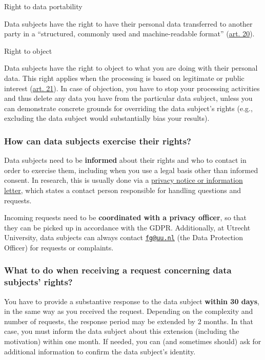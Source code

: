 \documentclass[
]{book}
\begin{document}
Right to data portability

Data subjects have the right to have their personal data transferred to
another party in a ``structured, commonly used and machine-readable format''
(\href{https://gdpr-info.eu/art-20-gdpr/}{art. 20}).

Right to object

Data subjects have the right to object to what you are doing with their
personal data. This right applies when the processing is based on legitimate
or public interest (\href{https://gdpr-info.eu/art-21-gdpr/}{art. 21}).
In case of objection, you have to stop your processing activities and thus
delete any data you have from the particular data subject, unless you can
demonstrate concrete grounds for overriding the data subject's rights
(e.g., excluding the data subject would substantially bias your results).

\hypertarget{how-can-data-subjects-exercise-their-rights}{%
\subsubsection{How can data subjects exercise their rights?}\label{how-can-data-subjects-exercise-their-rights}}

Data subjects need to be \textbf{informed} about their rights and who to contact in
order to exercise them, including when you use a legal basis other than informed
consent. In research, this is usually done via a
\protect\hyperlink{privacy-notices}{privacy notice or information letter}, which states
a contact person responsible for handling questions and requests.

Incoming requests need to be \textbf{coordinated with a privacy officer}, so that
they can be picked up in accordance with the GDPR. Additionally, at Utrecht
University, data subjects can always contact
\href{mailto:fg@uu.nl}{\nolinkurl{fg@uu.nl}} (the Data Protection Officer) for
requests or complaints.

\hypertarget{what-to-do-when-receiving-a-request-concerning-data-subjects-rights}{%
\subsubsection{What to do when receiving a request concerning data subjects' rights?}\label{what-to-do-when-receiving-a-request-concerning-data-subjects-rights}}

You have to provide a substantive response to the data subject \textbf{within 30 days},
in the same way as you received the request. Depending on the complexity and
number of requests, the response period may be extended by 2 months. In that
case, you must inform the data subject about this extension (including the
motivation) within one month. If needed, you can (and sometimes should) ask for
additional information to confirm the data subject's identity.
\end{document}
